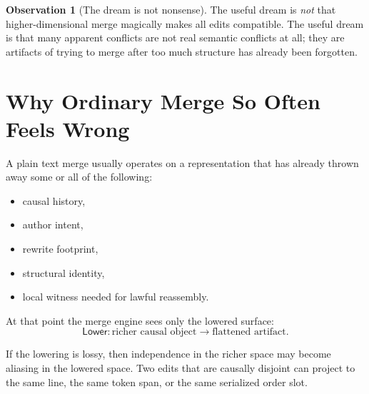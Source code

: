 \documentclass[11pt]{article}
\newcommand{\Lower}{\ensuremath{\mathsf{Lower}}}
\theoremstyle{definition}
\newtheorem{observation}{Observation}
\begin{document}
\begin{observation}[The dream is not nonsense]
The useful dream is \emph{not} that higher-dimensional merge magically makes
all edits compatible. The useful dream is that many apparent conflicts are not
real semantic conflicts at all; they are artifacts of trying to merge after
too much structure has already been forgotten.
\end{observation}

\section{Why Ordinary Merge So Often Feels Wrong}

A plain text merge usually operates on a representation that has already thrown
away some or all of the following:
\begin{itemize}[leftmargin=2em]
\item causal history,
\item author intent,
\item rewrite footprint,
\item structural identity,
\item local witness needed for lawful reassembly.
\end{itemize}

At that point the merge engine sees only the lowered surface:
\[
\Lower : \text{richer causal object} \to \text{flattened artifact}.
\]

If the lowering is lossy, then independence in the richer space may become
aliasing in the lowered space. Two edits that are causally disjoint can project
to the same line, the same token span, or the same serialized order slot.
\end{document}
